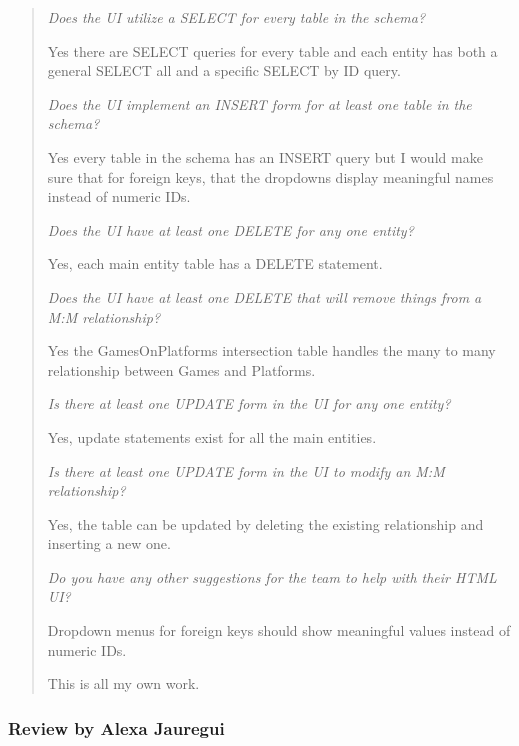 \documentclass[11pt]{article}
\begin{document}
\begin{quote}
\textit{Does the UI utilize a SELECT for every table in the schema?}

Yes there are SELECT queries for every table and each entity has both a general SELECT all and a specific SELECT by ID query.

\textit{Does the UI implement an INSERT form for at least one table in the schema?}

Yes every table in the schema has an INSERT query but I would make sure that for foreign keys, that the dropdowns display meaningful names instead of numeric IDs.

\textit{Does the UI have at least one DELETE for any one entity?}

Yes, each main entity table has a DELETE statement.

\textit{Does the UI have at least one DELETE that will remove things from a M:M relationship?}

Yes the GamesOnPlatforms intersection table handles the many to many relationship between Games and Platforms.

\textit{Is there at least one UPDATE form in the UI for any one entity?}

Yes, update statements exist for all the main entities.

\textit{Is there at least one UPDATE form in the UI to modify an M:M relationship?}

Yes, the table can be updated by deleting the existing relationship and inserting a new one.

\textit{Do you have any other suggestions for the team to help with their HTML UI?}

Dropdown menus for foreign keys should show meaningful values instead of numeric IDs.

This is all my own work.
\end{quote}

\subsubsection*{Review by Alexa Jauregui}
\end{document}
